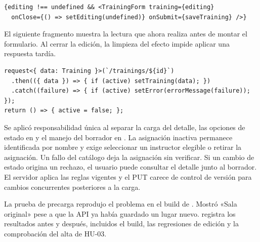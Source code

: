 \begin{verbatim}
{editing !== undefined && <TrainingForm training={editing}
  onClose={() => setEditing(undefined)} onSubmit={saveTraining} />}
\end{verbatim}

El siguiente fragmento muestra la lectura que ahora realiza
 antes de montar el formulario. Al cerrar la edición, la
limpieza del efecto impide aplicar una respuesta tardía.

\begin{verbatim}
request<{ data: Training }>(`/trainings/${id}`)
  .then(({ data }) => { if (active) setTraining(data); })
  .catch((failure) => { if (active) setError(errorMessage(failure)); });
return () => { active = false; };
\end{verbatim}

Se aplicó responsabilidad única al separar la carga del detalle, las opciones
de estado en  y el manejo del borrador en
. La asignación inactiva permanece identificada por
nombre y exige seleccionar un instructor elegible o retirar la asignación.
Un fallo del catálogo deja la asignación sin verificar. Si un cambio de estado
origina un rechazo, el usuario puede consultar el detalle junto al
borrador. El servidor aplica las reglas vigentes y el PUT carece de control de
versión para cambios concurrentes posteriores a la carga.

La prueba de precarga reprodujo el problema en el build de .
Mostró «Sala original» pese a que la API ya había guardado un lugar nuevo.
 registra los resultados antes y después, incluidos el
build, las regresiones de edición y la comprobación del alta de HU-03.


